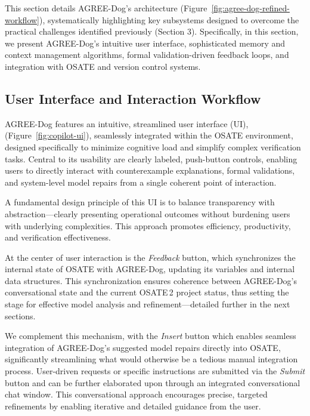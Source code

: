 \label{sec:design-architecture}

This section details AGREE-Dog’s architecture (Figure~\ref{fig:agree-dog-refined-workflow}), systematically highlighting key subsystems designed to overcome the practical challenges identified previously (Section 3). 
%
Specifically, in this section, we present AGREE-Dog’s intuitive user interface, sophisticated memory and context management algorithms, formal validation-driven feedback loops, and integration with OSATE and version control systems.



\subsection{User Interface and Interaction Workflow}
AGREE-Dog features an intuitive, streamlined user interface (UI), (Figure~\ref{fig:copilot-ui}), seamlessly integrated within the OSATE environment, designed specifically to minimize cognitive load and simplify complex verification tasks. Central to its usability are clearly labeled, push-button controls, enabling users to directly interact with counterexample explanations, formal validations, and system-level model repairs from a single coherent point of interaction.

A fundamental design principle of this UI is to balance transparency with abstraction—clearly presenting operational outcomes without burdening users with underlying complexities. This approach promotes efficiency, productivity, and verification effectiveness.

At the center of user interaction is the \textit{Feedback} button, which synchronizes the internal state of OSATE with AGREE-Dog, updating its variables and internal data structures. This synchronization ensures coherence between AGREE-Dog's conversational state and the current OSATE\,2 project status, thus setting the stage for effective model analysis and refinement—detailed further in the next sections.%
%

We complement this mechanism, with the \textit{Insert} button which enables seamless integration of AGREE-Dog’s suggested model repairs directly into OSATE,
significantly streamlining what would otherwise be a tedious manual integration process.
%
User-driven requests or specific instructions are submitted via the \textit{Submit} button and can be further elaborated upon through an integrated conversational chat window. This conversational approach encourages precise, targeted refinements by enabling iterative and detailed guidance from the user.


